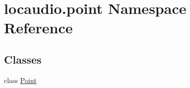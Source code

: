\hypertarget{namespacelocaudio_1_1point}{\section{locaudio.\-point Namespace Reference}
\label{namespacelocaudio_1_1point}
}
\subsection*{Classes}
\begin{DoxyCompactItemize}
\item 
class \hyperlink{classlocaudio_1_1point_1_1Point}{Point}
\end{DoxyCompactItemize}

